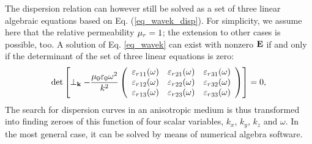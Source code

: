 The dispersion relation can however still be solved \cite[pp. 667]{born1999book} as a set of three linear algebraic equations based on Eq. (\ref{eq_wavek_disp}).
For simplicity, we assume here that the relative permeability $\mu_r = 1$; the extension to other cases is possible, too. %
A solution of Eq. \ref{eq_wavek} can exist with nonzero $\mathbf{E}$ if and only if the determinant of the set of three linear equations is zero:
\begin{equation} 
\det\left[
\perp_{\mathbf{k}} -
	\frac{\mu_0 \varepsilon_0 \omega^2}{k^2}
	\left(\begin{array}{ccc} 
	{\varepsilon_r}_{11}(\omega) & {\varepsilon_r}_{21}(\omega) & {\varepsilon_r}_{31}(\omega)  \\
	{\varepsilon_r}_{12}(\omega) & {\varepsilon_r}_{22}(\omega) & {\varepsilon_r}_{32}(\omega)  \\
	{\varepsilon_r}_{13}(\omega) & {\varepsilon_r}_{23}(\omega) & {\varepsilon_r}_{33}(\omega)  
	\end{array} \right) \right] = 0, \label{eq_dispdet}\end{equation}
The search for dispersion curves in an anisotropic medium is thus transformed into finding zeroes of this function of four scalar variables, $k_x$, $k_y$, $k_z$ and $\omega$.
In the most general case, it can be solved by means of numerical algebra software. 

